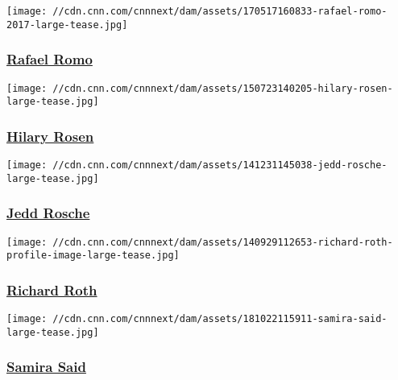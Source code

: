 \href{/profiles/rafael-romo-profile}{}

\texttt{[image: //cdn.cnn.com/cnnnext/dam/assets/170517160833-rafael-romo-2017-large-tease.jpg]}

\hypertarget{rafael-romo}{%
\subsubsection{\texorpdfstring{\href{/profiles/rafael-romo-profile}{Rafael
Romo}}{Rafael Romo}}\label{rafael-romo}}

\href{/profiles/hilary-rosen-profile}{}

\texttt{[image: //cdn.cnn.com/cnnnext/dam/assets/150723140205-hilary-rosen-large-tease.jpg]}

\hypertarget{hilary-rosen-}{%
\subsubsection{\texorpdfstring{\href{/profiles/hilary-rosen-profile}{Hilary
Rosen }}{Hilary Rosen }}\label{hilary-rosen-}}

\href{/profiles/jedd-rosche}{}

\texttt{[image: //cdn.cnn.com/cnnnext/dam/assets/141231145038-jedd-rosche-large-tease.jpg]}

\hypertarget{jedd-rosche}{%
\subsubsection{\texorpdfstring{\href{/profiles/jedd-rosche}{Jedd
Rosche}}{Jedd Rosche}}\label{jedd-rosche}}

\href{/profiles/richard-roth-profile}{}

\texttt{[image: //cdn.cnn.com/cnnnext/dam/assets/140929112653-richard-roth-profile-image-large-tease.jpg]}

\hypertarget{richard-roth}{%
\subsubsection{\texorpdfstring{\href{/profiles/richard-roth-profile}{Richard
Roth}}{Richard Roth}}\label{richard-roth}}

\href{/profiles/samira-said}{}

\texttt{[image: //cdn.cnn.com/cnnnext/dam/assets/181022115911-samira-said-large-tease.jpg]}

\hypertarget{samira-said}{%
\subsubsection{\texorpdfstring{\href{/profiles/samira-said}{Samira
Said}}{Samira Said}}\label{samira-said}}

